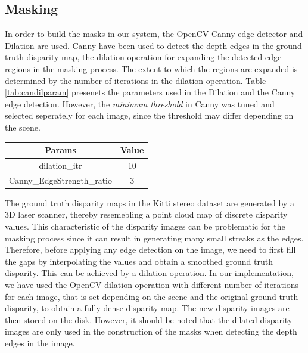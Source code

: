 \subsection{Masking}
In order to build the masks in our system, the OpenCV Canny edge detector and Dilation are used.
Canny have been used to detect the depth edges in the ground truth disparity map, the dilation operation 
for expanding the detected edge regions in the masking process. The extent to which the regions are expanded
is determined by the number of iterations in the dilation operation. Table \ref{tab:candilparam} presenets the parameters used in the Dilation
and the Canny edge detection. However, the \textit{minimum threshold} in Canny was tuned and selected seperately for each image, 
since the threshold may differ depending on the scene.

{\footnotesize
\begin{minipage}{\linewidth}
\begin{center}
\label{tab:candilparam}
\begin{tabular}{ |c|c| }
\hline
\textbf{Params} & \textbf{Value} \\ \hline
dilation\_itr & 10 \\  \hline
Canny\_EdgeStrength\_ratio & 3 \\ \hline
\end{tabular}
\end{center}
\end{minipage} \newline
}

The ground truth disparity maps in the Kitti stereo dataset are generated by a 3D laser scanner, thereby resemebling
a point cloud map of discrete disparity values. This characteristic of the disparity images 
can be problematic for the masking process since it can result in generating many small streaks as the edges.
Therefore, before applying any edge
detection on the image, we need to first fill the gaps by interpolating the values and obtain a smoothed ground truth disparity.
This can be achieved by a dilation operation.
In our implementation, we have used the OpenCV dilation operation with different number of iterations for each image, that is set depending on the scene 
and the original ground truth disparity, to obtain a fully dense disparity map. 
The new disparity images are then stored on the disk. 
However, it should be noted that the dilated disparity images are only used in the construction of the masks when detecting the depth
edges in the image.

